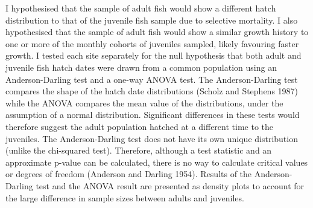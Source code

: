 \documentclass[]{book}
\begin{document}
I hypothesised that the sample of adult fish would show a different
hatch distribution to that of the juvenile fish sample due to selective
mortality. I also hypothesised that the sample of adult fish would show
a similar growth history to one or more of the monthly cohorts of
juveniles sampled, likely favouring faster growth. I tested each site
separately for the null hypothesis that both adult and juvenile fish
hatch dates were drawn from a common population using an
Anderson-Darling test and a one-way ANOVA test. The Anderson-Darling
test compares the shape of the hatch date distributions (Scholz and
Stephens 1987) while the ANOVA compares the mean value of the
distributions, under the assumption of a normal distribution.
Significant differences in these tests would therefore suggest the adult
population hatched at a different time to the juveniles. The
Anderson-Darling test does not have its own unique distribution (unlike
the chi-squared test). Therefore, although a test statistic and an
approximate p-value can be calculated, there is no way to calculate
critical values or degrees of freedom (Anderson and Darling 1954).
Results of the Anderson-Darling test and the ANOVA result are presented
as density plots to account for the large difference in sample sizes
between adults and juveniles.
\end{document}
